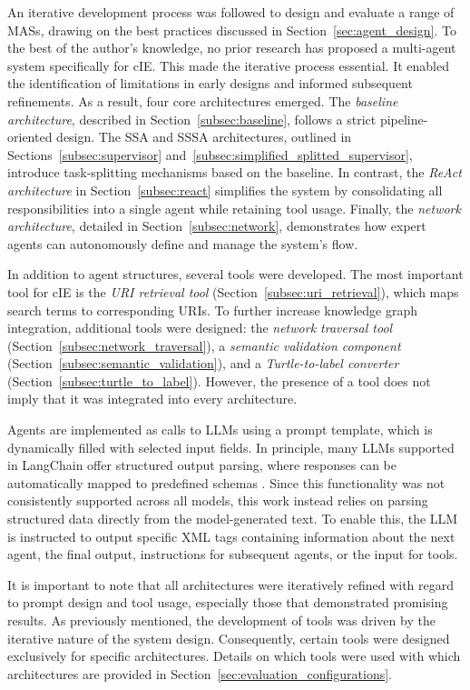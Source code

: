 \documentclass[a4paper,oneside,bibliography=totoc]{scrbook}
\begin{document}
An iterative development process was followed to design and evaluate a range of \acp{MAS}, drawing on the best practices discussed in Section~\ref{sec:agent_design}. To the best of the author's knowledge, no prior research has proposed a multi-agent system specifically for \ac{cIE}. This made the iterative process essential. It enabled the identification of limitations in early designs and informed subsequent refinements. As a result, four core architectures emerged. The \textit{baseline architecture}, described in Section~\ref{subsec:baseline}, follows a strict pipeline-oriented design. The \ac{SSA} and \ac{SSSA} architectures, outlined in Sections~\ref{subsec:supervisor} and~\ref{subsec:simplified_splitted_supervisor}, introduce task-splitting mechanisms based on the baseline. In contrast, the \textit{ReAct architecture} in Section~\ref{subsec:react} simplifies the system by consolidating all responsibilities into a single agent while retaining tool usage. Finally, the \textit{network architecture}, detailed in Section~\ref{subsec:network}, demonstrates how expert agents can autonomously define and manage the system's flow.

In addition to agent structures, several tools were developed. The most important tool for \ac{cIE} is the \textit{URI retrieval tool} (Section~\ref{subsec:uri_retrieval}), which maps search terms to corresponding URIs. To further increase knowledge graph integration, additional tools were designed: the \textit{network traversal tool} (Section~\ref{subsec:network_traversal}), a \textit{semantic validation component} (Section~\ref{subsec:semantic_validation}), and a \textit{Turtle-to-label converter} (Section~\ref{subsec:turtle_to_label}). However, the presence of a tool does not imply that it was integrated into every architecture.

Agents are implemented as calls to \acp{LLM} using a prompt template, which is dynamically filled with selected input fields. In principle, many \acp{LLM} supported in LangChain offer structured output parsing, where responses can be automatically mapped to predefined schemas \cite{LangChain2025e}. Since this functionality was not consistently supported across all models, this work instead relies on parsing structured data directly from the model-generated text. To enable this, the \ac{LLM} is instructed to output specific XML tags containing information about the next agent, the final output, instructions for subsequent agents, or the input for tools.

It is important to note that all architectures were iteratively refined with regard to prompt design and tool usage, especially those that demonstrated promising results. As previously mentioned, the development of tools was driven by the iterative nature of the system design. Consequently, certain tools were designed exclusively for specific architectures. Details on which tools were used with which architectures are provided in Section~\ref{sec:evaluation_configurations}.
\end{document}
